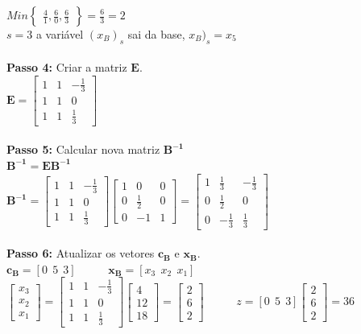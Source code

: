 {\begin{minipage}[l]{14,2cm}
$Min\begin{Bmatrix}
\frac{4}{1},\frac{6}{0},\frac{6}{3}
\end{Bmatrix} = \frac{6}{3} = 2$\\
$s=3$ a variável $(x_{B})_{s}$ sai da base, $x_{B})_{s} = x_{5}$
\\ \\
\textbf{Passo 4:} Criar a matriz $\mathbf{E}$.
\\$\mathbf{E}=\begin{bmatrix}
1 & 1 & -\frac{1}{3}\\
1 & 1 & 0\\
1 & 1 & \frac{1}{3}
\end{bmatrix}$
\\ \\
\textbf{Passo 5:} Calcular nova matriz $\mathbf{B^{-1}}$ 
\\$\mathbf{B^{-1}} = \mathbf{EB^{-1}}$
\\$\mathbf{B^{-1}} = \begin{bmatrix}
1 & 1 & -\frac{1}{3}\\
1 & 1 & 0\\
1 & 1 & \frac{1}{3}
\end{bmatrix}\begin{bmatrix}
1 & 0 & 0 \\
0 & \frac{1}{2} & 0 \\
0 & -1 & 1
\end{bmatrix}=\begin{bmatrix}
1 & \frac{1}{3} & -\frac{1}{3} \\
0 & \frac{1}{2} & 0 \\
0 & -\frac{1}{3} & \frac{1}{3}
\end{bmatrix}$
\\ \\
\textbf{Passo 6:} Atualizar os vetores $\mathbf{c{_B}}$ e $\mathbf{x{_B}}$.
\\$\mathbf{c{_B}}=[0\ \ 5\ \ 3]$
 \ \ \ \ \ $\mathbf{x{_B}}=[x{_3}\ \ x{_2}\ \ x{_1}]$
\\$\begin{bmatrix}
x{_3} \\
x{_2} \\
x{_1} 
\end{bmatrix} = \begin{bmatrix}
1 & 1 & -\frac{1}{3}\\
1 & 1 & 0\\
1 & 1 & \frac{1}{3}
\end{bmatrix}\begin{bmatrix}
4 \\
12 \\
18 
\end{bmatrix} = \begin{bmatrix}
2 \\
6 \\
2 
\end{bmatrix}$
 \ \ \ \ \ $z = [0\ \ 5\ \ 3]\begin{bmatrix}
2 \\
6 \\
2 
\end{bmatrix} = 36$
\end{minipage}
}

